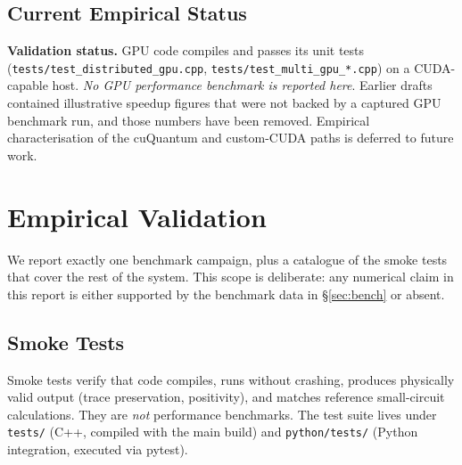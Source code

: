 \documentclass[11pt,a4paper]{article}
\begin{document}
\subsection{Current Empirical Status}

\begin{infobox}
\textbf{Validation status.} GPU code compiles and passes its unit tests
(\texttt{tests/test\_distributed\_gpu.cpp}, \texttt{tests/test\_multi\_gpu\_*.cpp}) on
a CUDA-capable host. \emph{No GPU performance benchmark is reported here}. Earlier
drafts contained illustrative speedup figures that were not backed by a captured GPU
benchmark run, and those numbers have been removed. Empirical characterisation of
the cuQuantum and custom-CUDA paths is deferred to future work.
\end{infobox}

\section{Empirical Validation}
\label{sec:empirical}

We report exactly one benchmark campaign, plus a catalogue of the smoke tests that
cover the rest of the system. This scope is deliberate: any numerical claim in this
report is either supported by the benchmark data in \S\ref{sec:bench} or absent.

\subsection{Smoke Tests}
\label{sec:smoke}

Smoke tests verify that code compiles, runs without crashing, produces physically
valid output (trace preservation, positivity), and matches reference small-circuit
calculations. They are \emph{not} performance benchmarks. The test suite lives under
\texttt{tests/} (C++, compiled with the main build) and \texttt{python/tests/} (Python
integration, executed via pytest).
\end{document}
